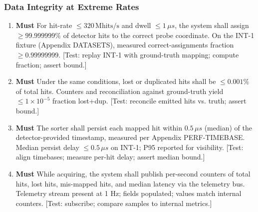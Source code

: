 \documentclass[12pt]{article}
\newcommand{\PriorityTag}[2]{%
  \colorbox{#2!25}{\footnotesize\textsf{\textbf{#1}}}\hspace{0.6em}}
\newcommand{\must}{\leavevmode\PriorityTag{Must}{green}}
\newcounter{reqgrp}[section] %
\newcounter{reqno}
\newcommand{\reqprefix}{GEN}
\newenvironment{requirements}[1]{%
  \renewcommand{\reqprefix}{#1}%
  \refstepcounter{reqgrp}%
  \setcounter{reqno}{0}%
  \begin{enumerate}[leftmargin=*]
}{\end{enumerate}}
\begin{document}
\subsubsection{Data Integrity at Extreme Rates}
\begin{requirements}{INT}

\item \must {}
  {For hit-rate \(\le 320\,\mathrm{Mhits/s}\) and dwell \(\le 1\,\mu s\), the system shall assign \(\ge 99.999999\%\) of detector hits to the correct probe coordinate.}
  {On the INT-1 fixture (Appendix DATASETS), measured correct-assignments fraction \(\ge 0.99999999\).}
  [Test: replay INT-1 with ground-truth mapping; compute fraction; assert bound.]

\item \must {}
  {Under the same conditions, lost or duplicated hits shall be \(\le 0.001\%\) of total hits.}
  {Counters and reconciliation against ground-truth yield \(\le 1\times10^{-5}\) fraction lost+dup.}
  [Test: reconcile emitted hits vs. truth; assert bound.]

\item \must {}
  {The sorter shall persist each mapped hit within \(0.5\,\mu s\) (median) of the detector-provided timestamp, measured per Appendix PERF-TIMEBASE.}
  {Median persist delay \(\le 0.5\,\mu s\) on INT-1; P95 reported for visibility.}
  [Test: align timebases; measure per-hit delay; assert median bound.]

\item \must {}
  {While acquiring, the system shall publish per-second counters of total hits, lost hits, mis-mapped hits, and median latency via the telemetry bus.}
  {Telemetry stream present at 1 Hz; fields populated; values match internal counters.}
  [Test: subscribe; compare samples to internal metrics.]

\end{requirements}



\end{document}
